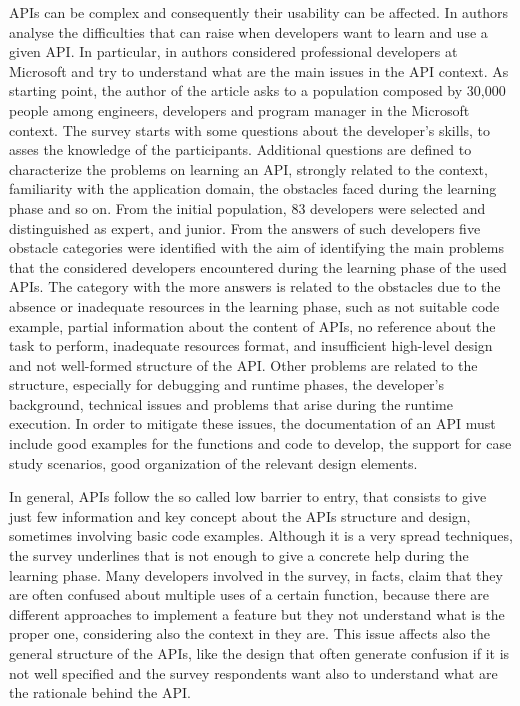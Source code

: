 APIs can be complex and consequently their usability can be affected. In 
\cite{martin_p._robillard_what_2009} authors analyse the difficulties that can 
raise when developers want to learn and use a given API. In particular, in 
\cite{martin_p._robillard_what_2009} authors considered professional developers 
at Microsoft and try to understand what are the main issues in the API context. 
As starting point, the author of the article asks to a population composed by 
30,000 people among engineers, developers and program manager in the Microsoft 
context. The survey starts with some questions about the developer's skills, to 
asses the knowledge of the participants. Additional questions are defined to 
characterize the problems on learning an API, strongly related to the context, 
familiarity with the application domain, the obstacles faced during the 
learning phase and so on. From the initial population, 83 developers were 
selected and distinguished as expert, and junior. From the answers of such 
developers five obstacle categories were identified with the aim of identifying 
the main problems that the considered developers encountered during the 
learning phase of the used APIs. The category with the more answers is related 
to the obstacles due to the absence or inadequate resources in the learning 
phase, such as not suitable code example, partial information about the content 
of APIs, no reference about the task to perform, inadequate resources format, 
and insufficient high-level design and not well-formed structure of the API. 
Other problems are related to the structure, especially for debugging and 
runtime phases, the developer's background, technical issues and problems that 
arise during the runtime execution.
%
In order to mitigate these issues, the documentation of an API must include 
good examples for the functions and code to develop, the support for case study 
scenarios, good organization of the relevant design elements. 


In general, APIs follow the so called low barrier to entry, that consists to 
give just few information and key concept about the APIs structure and design, 
sometimes involving basic code examples. Although it is a very spread 
techniques, the survey underlines that is not enough to give a concrete help 
during the learning phase. Many developers involved in the survey, in facts, 
claim that they are often confused about multiple uses of a certain function, 
because there are different approaches to implement a feature but they not 
understand what is the proper one, considering also the context in they are. 
This issue affects also the general structure of the APIs, like the design that 
often generate confusion if it is not well specified and the survey respondents 
want also to understand what are the rationale behind the API. 

